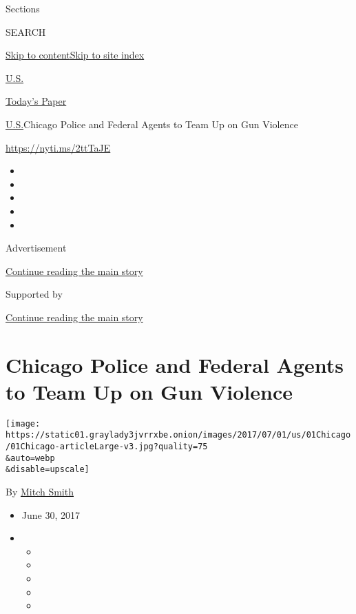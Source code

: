 Sections

SEARCH

\protect\hyperlink{site-content}{Skip to
content}\protect\hyperlink{site-index}{Skip to site index}

\href{https://www.nytimes3xbfgragh.onion/section/us}{U.S.}

\href{https://myaccount.nytimes3xbfgragh.onion/auth/login?response_type=cookie\&client_id=vi}{}

\href{https://www.nytimes3xbfgragh.onion/section/todayspaper}{Today's
Paper}

\href{/section/us}{U.S.}\textbar{}Chicago Police and Federal Agents to
Team Up on Gun Violence

\url{https://nyti.ms/2ttTaJE}

\begin{itemize}
\item
\item
\item
\item
\item
\end{itemize}

Advertisement

\protect\hyperlink{after-top}{Continue reading the main story}

Supported by

\protect\hyperlink{after-sponsor}{Continue reading the main story}

\hypertarget{chicago-police-and-federal-agents-to-team-up-on-gun-violence}{%
\section{Chicago Police and Federal Agents to Team Up on Gun
Violence}\label{chicago-police-and-federal-agents-to-team-up-on-gun-violence}}

\texttt{[image: https://static01.graylady3jvrrxbe.onion/images/2017/07/01/us/01Chicago/01Chicago-articleLarge-v3.jpg?quality=75\\\&auto=webp\\\&disable=upscale]}

By \href{http://www.nytimes3xbfgragh.onion/by/mitch-smith}{Mitch Smith}

\begin{itemize}
\item
  June 30, 2017
\item
  \begin{itemize}
  \item
  \item
  \item
  \item
  \item
  \end{itemize}
\end{itemize}

